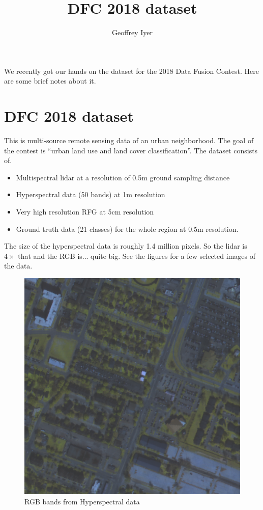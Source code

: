 \documentclass{article}[11pt]
\begin{document}
\title{DFC 2018 dataset}
\author{Geoffrey Iyer}
\maketitle

We recently got our hands on the dataset for the 2018 Data Fusion Contest. Here are some brief notes about it.

\section{DFC 2018 dataset}

This is multi-source remote sensing data of an urban neighborhood. The goal of the contest is ``urban land use and land cover classification''. The dataset consists of.
\begin{itemize}
\item Multispectral lidar at a resolution of 0.5m ground sampling distance
\item Hyperspectral data (50 bands) at 1m resolution
\item Very high resolution RFG at 5cm resolution
  \item Ground truth data (21 classes) for the whole region at 0.5m resolution.
\end{itemize}

The size of the hyperspectral data is roughly 1.4 million pixels. So the lidar is $4\times$ that and the RGB is... quite big. See the figures for a few selected images of the data.

\begin{figure}
  \includegraphics[width=\linewidth]{Hyperspectral.png}
  \caption{RGB bands from Hyperspectral data}
\end{figure}
\end{document}
